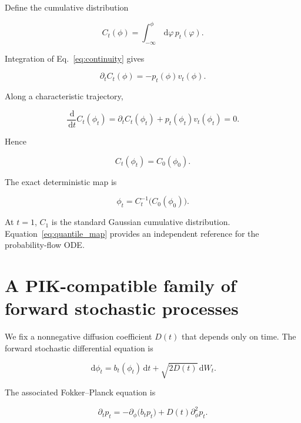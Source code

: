 \documentclass[reprint,twocolumn,superscriptaddress,preprintnumbers,amsmath,amssymb,aps,prd,floatfix]{revtex4-2}
\newcommand{\dd}{\,\mathrm{d}}
\begin{document}
Define the cumulative distribution

\begin{equation}
 C_t(\phi)
 =
 \int_{-\infty}^{\phi}\dd\varphi\,p_t(\varphi).
 \label{eq:cdf}
\end{equation}

Integration of Eq.~\eqref{eq:continuity} gives

\begin{equation}
 \partial_t C_t(\phi)
 =
 -p_t(\phi)v_t(\phi).
\end{equation}

Along a characteristic trajectory,

\begin{equation}
 \frac{\dd}{\dd t}C_t(\phi_t)
 =
 \partial_tC_t(\phi_t)
 +
 p_t(\phi_t)v_t(\phi_t)
 =
 0.
\end{equation}

Hence

\begin{equation}
 C_t(\phi_t)
 =
 C_0(\phi_0).
 \label{eq:cdf_conservation}
\end{equation}

The exact deterministic map is

\begin{equation}
 \phi_t
 =
 C_t^{-1}\bigl(C_0(\phi_0)\bigr).
 \label{eq:quantile_map}
\end{equation}

At $t=1$, $C_1$ is the standard Gaussian cumulative distribution. Equation~\eqref{eq:quantile_map} provides an independent reference for the probability-flow ODE.

\section{A PIK-compatible family of forward stochastic processes}

We fix a nonnegative diffusion coefficient $D(t)$ that depends only on time. The forward stochastic differential equation is

\begin{equation}
 \dd\phi_t
 =
 b_t(\phi_t)\dd t
 +
 \sqrt{2D(t)}\dd W_t.
 \label{eq:forward_sde}
\end{equation}

The associated Fokker--Planck equation is

\begin{equation}
 \partial_t p_t
 =
 -\partial_\phi\bigl(b_tp_t\bigr)
 +
 D(t)\partial_\phi^2p_t.
 \label{eq:fokker_planck}
\end{equation}
\end{document}

